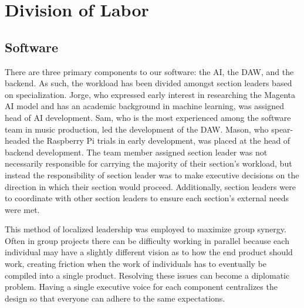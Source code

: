 \section{Division of Labor}

\subsection{Software}

There are three primary components to our software: the AI, the DAW, and the backend. As such, the
workload has been divided amongst section leaders based on specialization. Jorge, who expressed
early interest in researching the Magenta AI model and has an academic background in machine
learning, was assigned head of AI development. Sam, who is the most experienced among the software
team in music production, led the development of the DAW. Mason, who spear-headed the Raspberry Pi
trials in early development, was placed at the head of backend development. The team member
assigned section leader was not necessarily responsible for carrying the majority of their
section's workload, but instead the responsibility of section leader was to make executive
decisions on the direction in which their section would proceed. Additionally, section leaders
were to coordinate with other section leaders to ensure each section's external needs were met.

This method of localized leadership was employed to maximize group synergy. Often in group
projects there can be difficulty working in parallel because each individual may have a slightly
different vision as to how the end product should work, creating friction when the work of
individuals has to eventually be compiled into a single product. Resolving these issues can become
a diplomatic problem. Having a single executive voice for each component centralizes the design
so that everyone can adhere to the same expectations.
